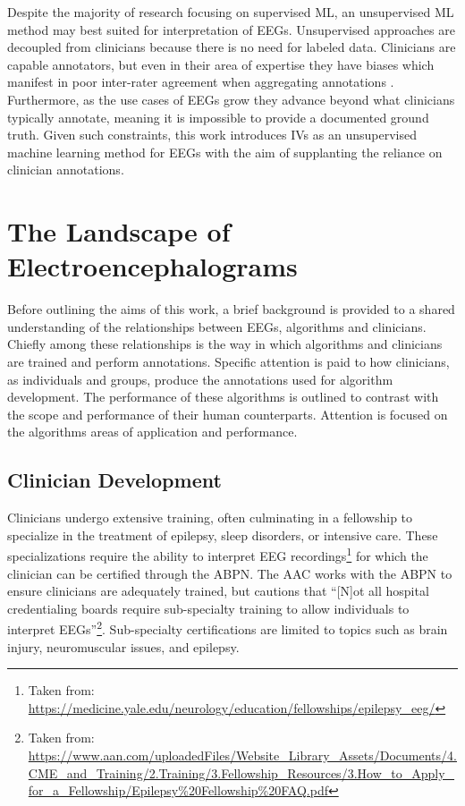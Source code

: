 Despite the majority of research focusing on supervised \ac{ML}, an unsupervised \ac{ML} method may best suited for interpretation of \acp{EEG}. Unsupervised approaches are decoupled from clinicians because there is no need for labeled data. Clinicians are capable annotators, but even in their area of expertise they have biases which manifest in poor inter-rater agreement when aggregating annotations \cite{Halford2017}.  Furthermore, as the use cases of \acp{EEG} grow they advance beyond what clinicians typically annotate, meaning it is impossible to provide a documented ground truth. Given such constraints, this work introduces \acp{IV} as an unsupervised machine learning method for \acp{EEG} with the aim of supplanting the reliance on clinician annotations.

\section{The Landscape of Electroencephalograms}

Before outlining the aims of this work, a brief background is provided to a shared understanding of the relationships between \acp{EEG}, algorithms and clinicians. Chiefly among these relationships is the way in which algorithms and clinicians are trained and perform annotations. Specific attention is paid to how clinicians, as individuals and groups, produce the annotations used for algorithm development. The performance of these algorithms is outlined to contrast with the scope and performance of their human counterparts. Attention is focused on the algorithms areas of application and performance.

\subsection{Clinician Development}

Clinicians undergo extensive training, often culminating in a fellowship to specialize in the treatment of epilepsy, sleep disorders, or intensive care. These specializations require the ability to interpret \ac{EEG} recordings\footnote{Taken from: \url{https://medicine.yale.edu/neurology/education/fellowships/epilepsy_eeg/}} for which the clinician can be certified through the \ac{ABPN}. The \ac{AAC} works with the \ac{ABPN} to ensure clinicians are adequately trained, but cautions that ``[N]ot all hospital credentialing boards require sub-specialty training to allow individuals to interpret \acp{EEG}''\footnote{Taken from: \url{https://www.aan.com/uploadedFiles/Website_Library_Assets/Documents/4.CME_and_Training/2.Training/3.Fellowship_Resources/3.How_to_Apply_for_a_Fellowship/Epilepsy\%20Fellowship\%20FAQ.pdf}}. Sub-specialty certifications are limited to topics such as brain injury, neuromuscular issues, and epilepsy.

